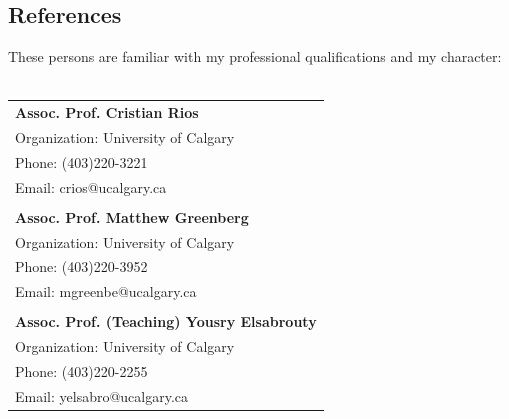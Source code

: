 \documentclass[12pt]{article}
\begin{document}
\subsection*{References}
These persons are familiar with my professional qualifications and my character:\\
\\
\begin{tabular}{l}
	\textbf{Assoc. Prof. Cristian Rios}\\
	Organization: University of Calgary\\
	Phone: (403)220-3221\\
	Email: crios@ucalgary.ca\\
	\\
	\textbf{Assoc. Prof. Matthew Greenberg}\\
	Organization: University of Calgary\\
	Phone: (403)220-3952\\
	Email: mgreenbe@ucalgary.ca\\
	\\
	\textbf{Assoc. Prof. (Teaching) Yousry Elsabrouty}\\
	Organization: University of Calgary\\
	Phone: (403)220-2255\\
	Email: yelsabro@ucalgary.ca
\end{tabular}
\end{document}
